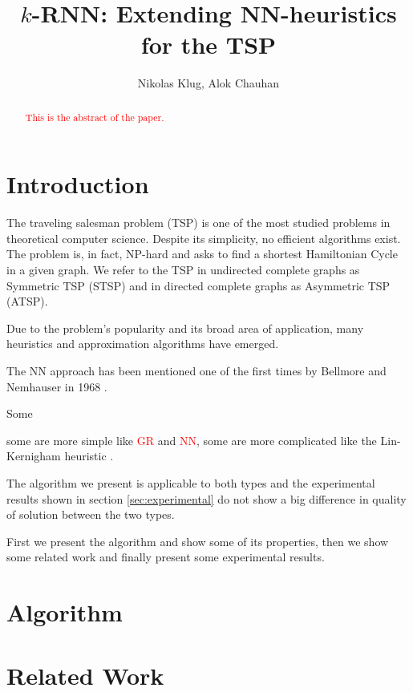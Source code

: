 \documentclass[11pt]{article}
\title{$k$-RNN: Extending NN-heuristics for the TSP}
\author{Nikolas Klug, Alok Chauhan}
\newcommand{\red}{\textcolor{red}}
\begin{document}
	\maketitle
	\begin{abstract}
		\red{This is the abstract of the paper.}
	\end{abstract}

	\section{Introduction}
	\label{sec:introduction}
	The traveling salesman problem (TSP) is one of the most studied problems in theoretical computer science. 
	Despite its simplicity, no efficient algorithms exist. 
	The problem is, in fact, NP-hard and asks to find a shortest Hamiltonian Cycle in a given graph.
	We refer to the TSP in undirected complete graphs as Symmetric TSP (STSP) and in directed complete graphs as Asymmetric TSP (ATSP).

	Due to the problem's popularity and its broad area of application, many heuristics and approximation algorithms have emerged.
	
	The NN approach has been mentioned one of the first times by Bellmore and Nemhauser in 1968 \cite{BELLMORE1968}.
	
	Some
	 
	 some are more simple like \red{GR} and \red{NN}, some are more complicated like the Lin-Kernigham heuristic \cite{LIN1973}.
	
	The algorithm we present is applicable to both types and the experimental results shown in section \ref{sec:experimental} do not show a big difference in quality of solution between the two types.
	
	First we present the algorithm and show some of its properties, then we show some related work and finally present some experimental results.
	


	
	\section{Algorithm}
	\label{sec:algorithm}
	
	
	\section{Related Work}
	\label{sec:related}
	
\end{document}
